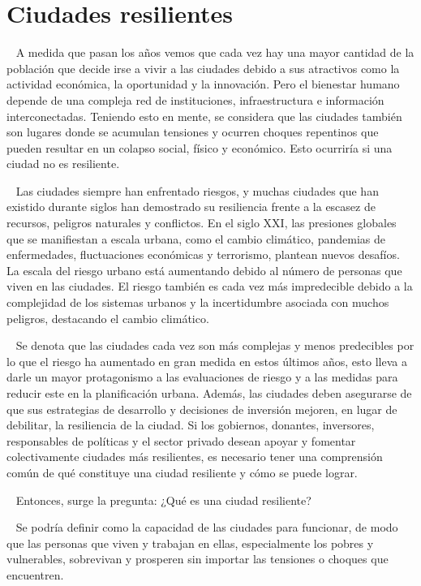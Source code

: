 \documentclass{article}
\begin{document}
\hypertarget{ciudades-resilientes}{%
\section{Ciudades resilientes}\label{ciudades-resilientes}}

~ A medida que pasan los años vemos que cada vez hay una mayor cantidad
de la población que decide irse a vivir a las ciudades debido a sus
atractivos como la actividad económica, la oportunidad y la innovación.
Pero el bienestar humano depende de una compleja red de instituciones,
infraestructura e información interconectadas. Teniendo esto en mente,
se considera que las ciudades también son lugares donde se acumulan
tensiones y ocurren choques repentinos que pueden resultar en un colapso
social, físico y económico. Esto ocurriría si una ciudad no es
resiliente.

~ Las ciudades siempre han enfrentado riesgos, y muchas ciudades que han
existido durante siglos han demostrado su resiliencia frente a la
escasez de recursos, peligros naturales y conflictos. En el siglo XXI,
las presiones globales que se manifiestan a escala urbana, como el
cambio climático, pandemias de enfermedades, fluctuaciones económicas y
terrorismo, plantean nuevos desafíos. La escala del riesgo urbano está
aumentando debido al número de personas que viven en las ciudades. El
riesgo también es cada vez más impredecible debido a la complejidad de
los sistemas urbanos y la incertidumbre asociada con muchos peligros,
destacando el cambio climático.

~ Se denota que las ciudades cada vez son más complejas y menos
predecibles por lo que el riesgo ha aumentado en gran medida en estos
últimos años, esto lleva a darle un mayor protagonismo a las
evaluaciones de riesgo y a las medidas para reducir este en la
planificación urbana. Además, las ciudades deben asegurarse de que sus
estrategias de desarrollo y decisiones de inversión mejoren, en lugar de
debilitar, la resiliencia de la ciudad. Si los gobiernos, donantes,
inversores, responsables de políticas y el sector privado desean apoyar
y fomentar colectivamente ciudades más resilientes, es necesario tener
una comprensión común de qué constituye una ciudad resiliente y cómo se
puede lograr.

~ Entonces, surge la pregunta: ¿Qué es una ciudad resiliente?

~ Se podría definir como la capacidad de las ciudades para funcionar, de
modo que las personas que viven y trabajan en ellas, especialmente los
pobres y vulnerables, sobrevivan y prosperen sin importar las tensiones
o choques que encuentren.
\end{document}
